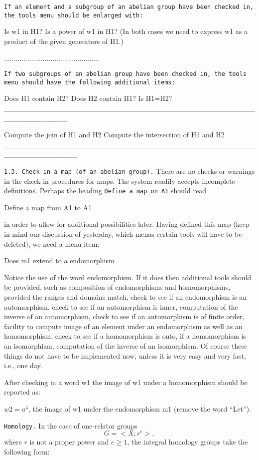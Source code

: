 {\tt If an element and a subgroup of an abelian group have
been checked in, the tools menu should  be enlarged with:


Is w1 in H1?
Is a power of w1 in H1?
(In both cases we need to express w1 as a product
of the given generators of H1.)

.................................................

{\tt If two subgroups of an abelian group have been checked
in, the tools menu should have the following additional items:

Does H1 contain H2?
Does H2 contain H1?
Is H1=H2?
____________________________________________________________

Compute the join of H1 and H2
Compute the intersection of H1 and H2
______________________________________________________________

{\tt 1.3. Check-in a map (of an abelian group).}
\m\ni There are no checks or warnings in the check-in procedures
for maps. The system readily accepts incomplete definitions.
Perhaps the heading {\tt Define a map on A1} should
read 

\m\ni Define a map from A1 to A1

\m\ni in order to allow for additional possibilities
later. Having defined this map (keep in mind our
discussion of yesterday, which menas certain tools will have
to be deleted), we need a menu item:

\m\ni Does m1 extend to a endomorphism

\m\ni Notice the use of the word endomorphism. 
If it does then additional tools should be provided,
such as composition of endomorphisms and homomorphisms, 
provided the ranges and domains match, check to see if
an endomorphism is an automorphism, check to see if
an automorphism is inner, computation of the inverse of
an automorphism, check to see if an automorphism
is of finite order, facility to compute image of an
element under an endomorphism as well as an homomorphism,
check to see if a homomorphism is onto, if a homomorphism
is an isomorphism, computation of the inverse of an 
isomorphism. Of course these things do not have to be
implemented now, unless it is very easy and very fast, i.e.,
one day. 

\m\ni After checking in a word w1 the image of w1 under
a homomorphism should be reported as:

\m\ni $ w2 = a^4$, the image of w1 under the endomorphism m1
(remove the word ``Let'').

\m\ni
{\tt Homology.} In the case of one-relator groups
$$G =<X; r^e>,$$
where $r$ is not a proper power and $e \geq 1$,  the integral
homology groups take the following form:

}}
